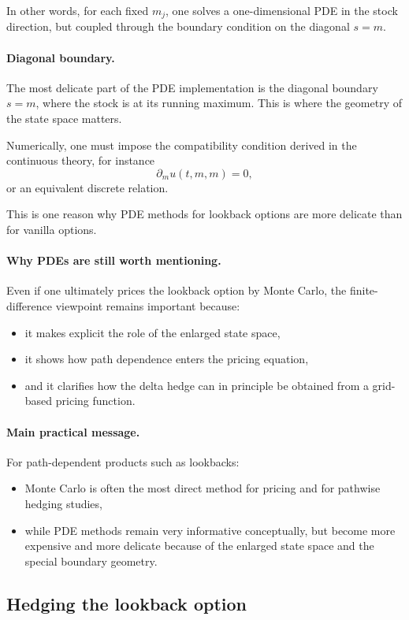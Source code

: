 \documentclass[11pt]{article}
\theoremstyle{plain}
\theoremstyle{definition}
\theoremstyle{remark}
\begin{document}
In other words, for each fixed \(m_j\), one solves a one-dimensional PDE
in the stock direction, but coupled through the boundary condition on
the diagonal \(s=m\).

\paragraph{Diagonal boundary.}
The most delicate part of the PDE implementation is the diagonal
boundary \(s=m\), where the stock is at its running maximum.
This is where the geometry of the state space matters.

Numerically, one must impose the compatibility condition derived in the
continuous theory, for instance
\[
\partial_m u(t,m,m)=0,
\]
or an equivalent discrete relation.

This is one reason why PDE methods for lookback options are more
delicate than for vanilla options.

\paragraph{Why PDEs are still worth mentioning.}
Even if one ultimately prices the lookback option by Monte Carlo, the
finite-difference viewpoint remains important because:
\begin{itemize}[leftmargin=1.4em]
    \item it makes explicit the role of the enlarged state space,
    \item it shows how path dependence enters the pricing equation,
    \item and it clarifies how the delta hedge can in principle be
    obtained from a grid-based pricing function.
\end{itemize}

\paragraph{Main practical message.}
For path-dependent products such as lookbacks:
\begin{itemize}[leftmargin=1.4em]
    \item Monte Carlo is often the most direct method for pricing and for
    pathwise hedging studies,
    \item while PDE methods remain very informative conceptually, but
    become more expensive and more delicate because of the enlarged state
    space and the special boundary geometry.
\end{itemize}
\subsection{Hedging the lookback option}
\end{document}

